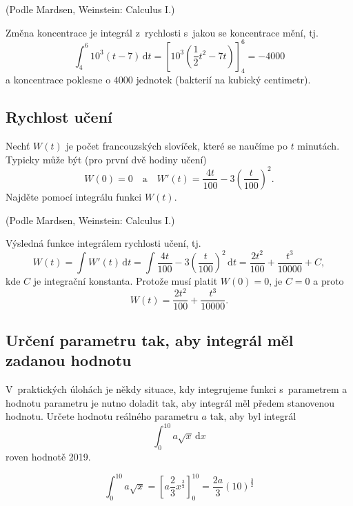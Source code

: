 (Podle Mardsen, Weinstein: Calculus I.)

\reseni
Změna koncentrace je integrál z rychlosti s jakou se koncentrace mění, tj. 
\begin{equation*}
  \int_4^6 10^3(t-7)\,\mathrm dt= \left[10^3\left (\frac 12 t^2-7t\right)\right]_4^6=-4000
\end{equation*}
a koncentrace poklesne o $4000$ jednotek (bakterií na kubický centimetr).
\konec

\stranka


\subsection{Rychlost učení} Nechť $W(t)$ je počet francouzských slovíček,
které se naučíme po $t$ minutách. Typicky může být (pro první dvě hodiny učení)
$$W(0)=0\quad \text {a} \quad W'(t)=\frac{4t}{100}-3\left (\frac  t{100}\right)^2.$$ Najděte pomocí integrálu funkci $W(t)$.

(Podle Mardsen, Weinstein: Calculus I.)

\reseni Výsledná funkce integrálem rychlosti učení, tj.
\begin{equation*}
W(t)=\int W'(t) \,\mathrm dt  =  \int \frac{4t}{100}-3\left (\frac  t{100}\right)^2 \,\mathrm dt  =\frac {2t^2}{100}+\frac{t^3}{10000} +C,
\end{equation*}
kde $C$ je integrační konstanta. Protože musí platit $W(0)=0$, je $C=0$ a proto
\begin{equation*}
  W(t)=\frac {2t^2}{100}+\frac{t^3}{10000}.
\end{equation*}

\konec


\stranka

\subsection{Určení parametru tak, aby integrál měl zadanou hodnotu}
V praktických úlohách je někdy situace, kdy integrujeme funkci s parametrem a hodnotu parametru je nutno doladit tak, aby integrál měl
předem stanovenou hodnotu.  Určete hodnotu reálného parametru $a$ tak,
aby byl integrál $$\int_0^{10} a \sqrt x\,\mathrm dx$$ roven hodnotě
2019.

\reseni

$$\int _0^{10} a\sqrt x=\left[a\frac 23 x^{\frac 32}\right]_0^{10}=\frac {2a}{3}(10)^{\frac 32}$$

